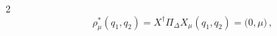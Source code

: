 \documentclass{article}
\newcommand{\M}{\mathcal{M}}                                %
\newcommand{\g}{\mathfrak{g}}                               %
\newcommand{\R}{\mathbb{R}}                                 %
\newcommand{\state}{x}
\begin{document}
\begin{multicols}{2}
\begin{equation}
    \rho_\mu^*(q_1,q_2) = X^\dagger\Pi_\Delta X_\mu(q_1,q_2) =  \big(0,\mu\big)\,,
\end{equation}

\end{multicols}
\end{document}
